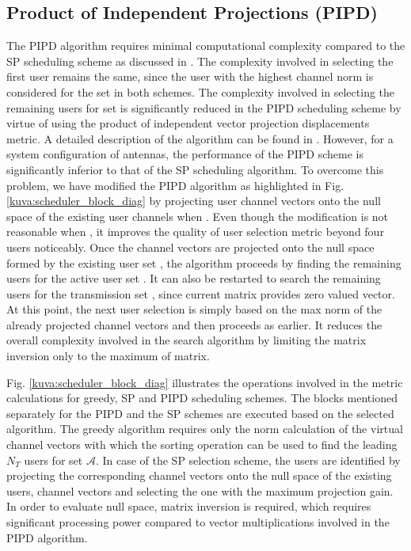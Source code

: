 \documentclass[conference,letterpaper,9pt]{./../IEEEtran}
\begin{document}
\subsection{Product of Independent Projections (PIPD)}
The PIPD algorithm requires minimal computational complexity compared to the SP scheduling scheme as discussed in \cite{venkatraman2014low}. The complexity involved in selecting the first user remains the same, since the user with the highest channel norm is considered for the set  in both schemes. The complexity involved in selecting the remaining users for set  is significantly reduced in the PIPD scheduling scheme by virtue of using the product of independent vector projection displacements metric. A detailed description of the algorithm can be found in \cite{venkatraman2014low}. However, for a system configuration of  antennas, the performance of the PIPD scheme is significantly inferior to that of the SP scheduling algorithm. To overcome this problem, we have modified the PIPD algorithm as highlighted in Fig. \ref{kuva:scheduler_block_diag} by projecting user channel vectors onto the null space of the existing user channels when . Even though the modification is not reasonable when , it improves the quality of user selection metric beyond four users noticeably. Once the channel vectors are projected onto the null space formed by the existing user set , the algorithm proceeds by finding the remaining users for the active user set . It can also be restarted to search the remaining  users for the transmission set , since current  matrix provides zero valued vector. At this point, the next user selection is simply based on the max norm of the already projected channel vectors and then proceeds as earlier. It reduces the overall complexity involved in the search algorithm by limiting the matrix inversion only to the maximum of  matrix.

Fig. \ref{kuva:scheduler_block_diag} illustrates the operations involved in the metric calculations for greedy, SP and PIPD scheduling schemes. The blocks mentioned separately for the PIPD and the SP schemes are executed based on the selected algorithm. The greedy algorithm requires only the norm calculation of the virtual channel vectors with which the sorting operation can be used to find the leading $N_T$ users for set $\mathcal{A}$. In case of the SP selection scheme, the users are identified by projecting the corresponding channel vectors onto the null space of the existing users, channel vectors and selecting the one with the maximum projection gain. In order to evaluate null space, matrix inversion is required, which requires significant processing power compared to vector multiplications involved in the PIPD algorithm.
\end{document}
